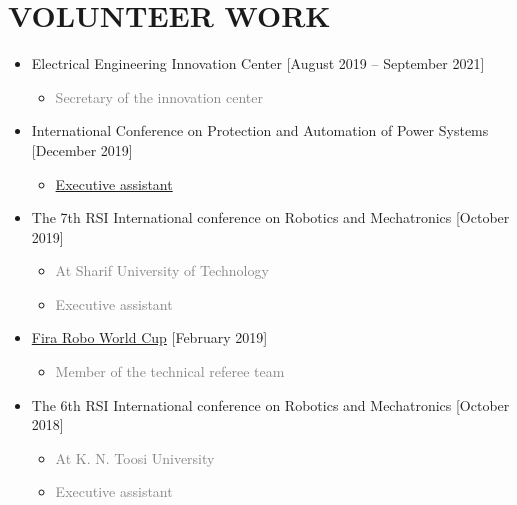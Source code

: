 \documentclass[10pt,a4paper,sans]{moderncv} %
\begin{document}
	\section{VOLUNTEER WORK}
		\begin{itemize}
		
		\item {} Electrical Engineering Innovation Center \hfill [August 2019 -- September 2021]
			\begin{itemize}
				\item \textcolor{gray}{Secretary of the innovation center}
			\end{itemize}
			
		\item {}International Conference on Protection and Automation of Power Systems \hfill [December 2019]
			\begin{itemize}
				\item \textcolor{gray}{\href{http://www.ipaps.ir/index_e.aspx}{Executive assistant}}
			\end{itemize}
			
			\item {} The 7th RSI International conference on Robotics and Mechatronics \hfill [October 2019]
			\begin{itemize}
				\item \textcolor{gray}{At Sharif University of Technology}
				\item \textcolor{gray}{Executive assistant}
			\end{itemize}
			
		\item {} \href{https://www.firaworldcup.org/VisitorPages/default.aspx?itemid=3} {Fira Robo World Cup} \hfill [February 2019]
			\begin{itemize}
				\item \textcolor{gray}{Member of  the technical referee team}
			\end{itemize}
			
		\item {} The 6th RSI International conference on Robotics and Mechatronics \hfill [October 2018]
			\begin{itemize}
				\item \textcolor{gray}{At K. N. Toosi University}
				\item \textcolor{gray}{Executive assistant}
			\end{itemize}
			

\end{itemize}
\end{document}

